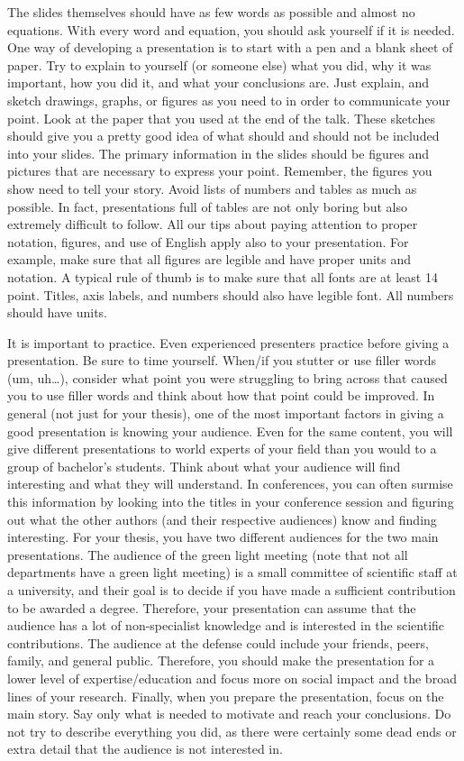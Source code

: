 \documentclass{article}
\begin{document}
The slides themselves should have as few words as possible and almost no equations. With every word and equation, you should ask yourself if it is needed. One way of developing a presentation is to start with a pen and a blank sheet of paper. Try to explain to yourself (or someone else) what you did, why it was important, how you did it, and what your conclusions are. Just explain, and sketch drawings, graphs, or figures as you need to in order to communicate your point. Look at the paper that you used at the end of the talk. These sketches should give you a pretty good idea of what should and should not be included into your slides. The primary information in the slides should be figures and pictures that are necessary to express your point. Remember, the figures you show need to tell your story. Avoid lists of numbers and tables as much as possible. In fact, presentations full of tables are not only boring but also extremely difficult to follow. All our tips about paying attention to proper notation, figures, and use of English apply also to your presentation. For example, make sure that all figures are legible and have proper units and notation. A typical rule of thumb is to make sure that all fonts are at least 14 point. Titles, axis labels, and numbers should also have legible font. All numbers should have units. 

It is important to practice. Even experienced presenters practice before giving a presentation. Be sure to time yourself. When/if you stutter or use filler words (um, uh…), consider what point you were struggling to bring across that caused you to use filler words and think about how that point could be improved. In general (not just for your thesis), one of the most important factors in giving a good presentation is knowing your audience. Even for the same content, you will give different presentations to world experts of your field than you would to a group of bachelor’s students. Think about what your audience will find interesting and what they will understand. In conferences, you can often surmise this information by looking into the titles in your conference session and figuring out what the other authors (and their respective audiences) know and finding interesting. For your thesis, you have two different audiences for the two main presentations. The audience of the green light meeting (note that not all departments have a green light meeting) is a small committee of scientific staff at a university, and their goal is to decide if you have made a sufficient contribution to be awarded a degree. Therefore, your presentation can assume that the audience has a lot of non-specialist knowledge and is interested in the scientific contributions. The audience at the defense could include your friends, peers, family, and general public. Therefore, you should make the presentation for a lower level of expertise/education and focus more on social impact and the broad lines of your research. Finally, when you prepare the presentation, focus on the main story. Say only what is needed to motivate and reach your conclusions. Do not try to describe everything you did, as there were certainly some dead ends or extra detail that the audience is not interested in.
\end{document}
